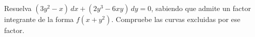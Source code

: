 Resuelva $(3y^2-x)\,dx+(2y^3-6xy)\,dy=0$, sabiendo que admite un factor integrante de la forma $f(x+y^2)$. Compruebe las curvas excluidas por ese factor.
